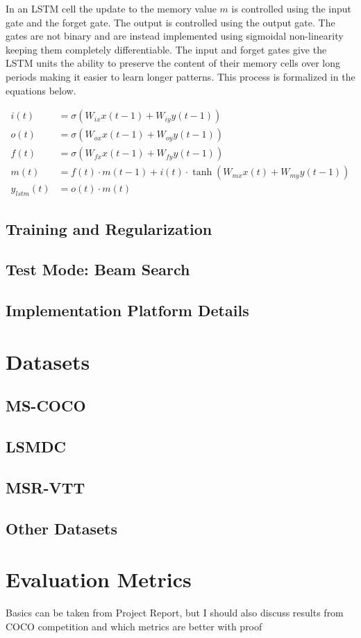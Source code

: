 In an LSTM cell the update to the memory value $m$ is controlled using the
input gate and the forget gate.  The output is controlled using the output
gate. The gates are not binary and are instead implemented using sigmoidal
non-linearity keeping them completely differentiable. 
The input and forget gates give the LSTM units the ability to preserve the
content of their memory cells over long periods making it easier to learn
longer patterns.
This process is formalized in the equations below.

\begin{align}
	i(t) &= \sigma(W_{ix}x(t-1) + W_{iy}y(t-1))\\
	o(t) &= \sigma(W_{ox}x(t-1) + W_{oy}y(t-1))\\
	f(t) &= \sigma(W_{fx}x(t-1) + W_{fy}y(t-1))\\
	m(t) &= f(t)\cdot m(t-1) + i(t)\cdot \tanh(W_{mx}x(t)+W_{my}y(t-1))\\
	y_{lstm}(t) &= o(t) \cdot m(t)
\end{align}


\subsection{Training and Regularization}
\subsection{Test Mode: Beam Search}
\subsection{Implementation Platform Details}
\section{Datasets}
\subsection{MS-COCO}
\subsection{LSMDC}
\subsection{MSR-VTT}
\subsection{Other Datasets}
\section{Evaluation Metrics}
Basics can be taken from Project Report, but I should also
discuss results from COCO competition and which metrics are better with proof
